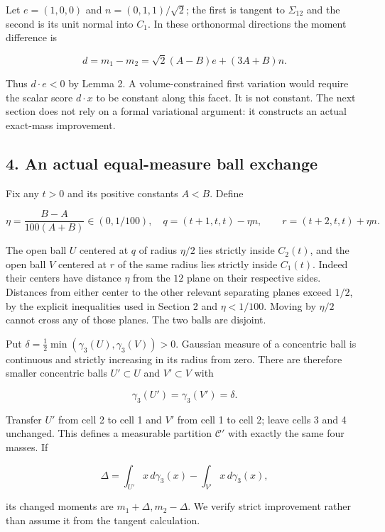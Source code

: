 \documentclass[
  11pt,
]{article}
\begin{document}
Let \(e=(1,0,0)\) and \(n=(0,1,1)/\sqrt2\); the first is tangent to
\(\Sigma_{12}\) and the second is its unit normal into \(C_1\). In these
orthonormal directions the moment difference is

\[
 d=m_1-m_2=\sqrt2(A-B)e+(3A+B)n.                         \tag{10}
\]

Thus \(d\cdot e<0\) by Lemma 2. A volume-constrained first variation
would require the scalar score \(d\cdot x\) to be constant along this
facet. It is not constant. The next section does not rely on a formal
variational argument: it constructs an actual exact-mass improvement.

\subsection{4. An actual equal-measure ball
exchange}\label{an-actual-equal-measure-ball-exchange}

Fix any \(t>0\) and its positive constants \(A<B\). Define

\[
 \eta=\frac{B-A}{100(A+B)}\in(0,1/100),\quad
 q=(t+1,t,t)-\eta n,\qquad r=(t+2,t,t)+\eta n.             \tag{11}
\]

The open ball \(U\) centered at \(q\) of radius \(\eta/2\) lies strictly
inside \(C_2(t)\), and the open ball \(V\) centered at \(r\) of the same
radius lies strictly inside \(C_1(t)\). Indeed their centers have
distance \(\eta\) from the \(12\) plane on their respective sides.
Distances from either center to the other relevant separating planes
exceed \(1/2\), by the explicit inequalities used in Section 2 and
\(\eta<1/100\). Moving by \(\eta/2\) cannot cross any of those planes.
The two balls are disjoint.

Put \(\delta=\tfrac12\min(\gamma_3(U),\gamma_3(V))>0\). Gaussian measure
of a concentric ball is continuous and strictly increasing in its radius
from zero. There are therefore smaller concentric balls \(U'\subset U\)
and \(V'\subset V\) with

\[
 \gamma_3(U')=\gamma_3(V')=\delta.                        \tag{12}
\]

Transfer \(U'\) from cell 2 to cell 1 and \(V'\) from cell 1 to cell 2;
leave cells 3 and 4 unchanged. This defines a measurable partition
\(\mathcal C'\) with exactly the same four masses. If

\[
 \Delta=\int_{U'}x\,d\gamma_3(x)-\int_{V'}x\,d\gamma_3(x), \tag{13}
\]

its changed moments are \(m_1+\Delta,m_2-\Delta\). We verify strict
improvement rather than assume it from the tangent calculation.
\end{document}
